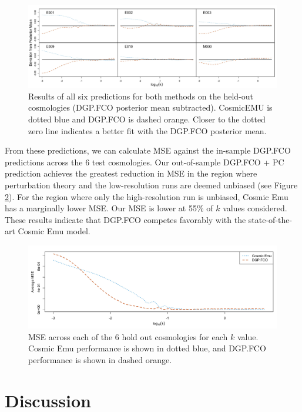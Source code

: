 \documentclass[11pt]{article}
\begin{document}
\begin{figure}[!b]
    \centering
    \includegraphics[width=\textwidth]{pred_1to6.jpeg}
    \caption{Results of all six predictions for both methods on the held-out 
    cosmologies (DGP.FCO posterior mean subtracted). CosmicEMU is dotted blue and DGP.FCO is dashed orange.
    Closer to the dotted zero line indicates a better fit with the DGP.FCO posterior mean.}
    \label{fig:plot_pred_1to6}
\end{figure}

From these predictions, we can calculate MSE against the in-sample DGP.FCO predictions across the 6
test cosmologies. 
Our out-of-sample DGP.FCO + PC prediction achieves the greatest reduction in MSE in the region 
where perturbation theory and the low-resolution runs are deemed unbiased (see Figure \ref{fig:mse_by_k}). 
For the region where only the high-resolution run is unbiased, Cosmic Emu has a marginally lower
MSE. Our MSE is lower at 55\% of $k$ values considered. These results indicate that DGP.FCO 
competes favorably with the state-of-the-art Cosmic Emu model.

\begin{figure}
    \centering
    \includegraphics[width=\textwidth]{mse_by_k.jpeg}
    \caption{MSE across each of the 6 hold out cosmologies for each $k$ value. Cosmic Emu 
    performance is shown in dotted blue, and DGP.FCO performance is shown in dashed orange.}
    \label{fig:mse_by_k}
\end{figure}

\section{Discussion}
\label{sec:disc}
\end{document}
